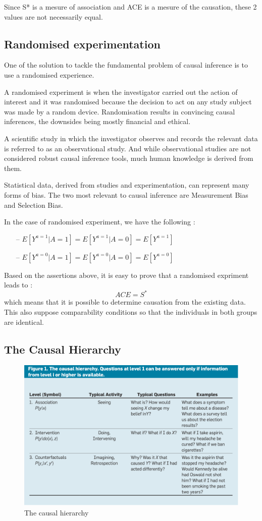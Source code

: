 \documentclass{article}
\begin{document}
Since S* is a mesure of association and ACE is a mesure of the causation, these 2 values are not necessarily equal.


\subsection{Randomised experimentation}

One of the solution to tackle the fundamental problem of causal inference is to use a randomised experience. 

A randomised experiment is when the investigator carried out the action of interest and it was randomised because the decision to act on any study subject was made by a random device. Randomisation results in convincing causal inferences, the downsides being mostly financial and ethical. 

A scientific study in which the investigator observes and records the relevant data is referred to as an observational study. And while observational studies are not considered robust causal inference tools, much human knowledge is derived from them.

Statistical data, derived from studies and experimentation, can represent many forms of bias. The two most relevant to causal inference are Measurement Bias and Selection Bias.


In the case of randomised experiment, we have the following : 

\begin{itemize}
\item[--] $ E[Y^{a=1}|A=1] =  E[Y^{a=1}|A=0] =  E[Y^{a=1}] $
\item[--] $ E[Y^{a=0}|A=1] =  E[Y^{a=0}|A=0] =  E[Y^{a=0}] $
\end{itemize}

Based on the assertions above, it is easy to prove that a randomised expriment leads to  : $$ ACE = S^{*} $$ which means that it is possible to determine causation from the existing data. This also suppose comparability conditions so that the individuals in both groups are identical.


\subsection{The Causal Hierarchy}

\begin{figure}[h]
\centering
\includegraphics[width=0.6 \textwidth]{../figures/asso_inter_caus.png}
\caption{The causal hierarchy\cite{pearl2019seven}}
\end{figure}
\end{document}
